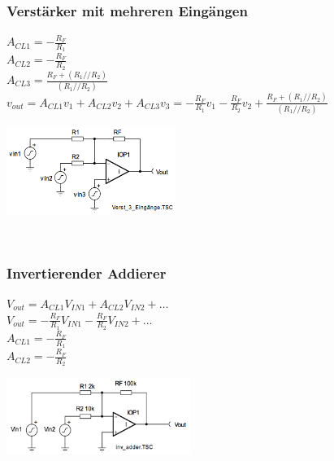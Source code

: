 		\subsubsection{Verstärker mit mehreren Eingängen}
			\begin{minipage}{12.5cm}
            	$A_{CL1}=-\frac{R_F}{R_1}$\\
            	$A_{CL2}=-\frac{R_F}{R_2}$\\
            	$A_{CL3}=\frac{R_F+(R_1//R_2)}{(R_1//R_2)}$\\
            	$v_{out}=A_{CL1}v_1+A_{CL2}v_2+A_{CL3}v_3=
            	-\frac{R_F}{R_1}v_1-\frac{R_F}{R_2}v_2+\frac{R_F+(R_1//R_2)}{(R_1//R_2)}$\\
      \end{minipage}
			\begin{minipage}{5.5cm}
      	\includegraphics[width=5.5cm]{./images/3-eingaenge.png}
      \end{minipage}\\

		\subsubsection{Invertierender Addierer}
			\begin{minipage}[b]{12cm}
            $V_{out}=A_{CL1}V_{IN1}+A_{CL2}V_{IN2}+\ldots$\\
            $V_{out}=- \frac{R_F}{R_1}V_{IN1}- \frac{R_F}{R_2}V_{IN2}+\ldots$\\
            $A_{CL1}=- \frac{R_F}{R_1}$\\
           	$A_{CL2}=- \frac{R_F}{R_2}$\\
      \end{minipage}
			\begin{minipage}{6cm}
      	\includegraphics[width=6cm]{./images/invertadd.png}
      \end{minipage}\\

